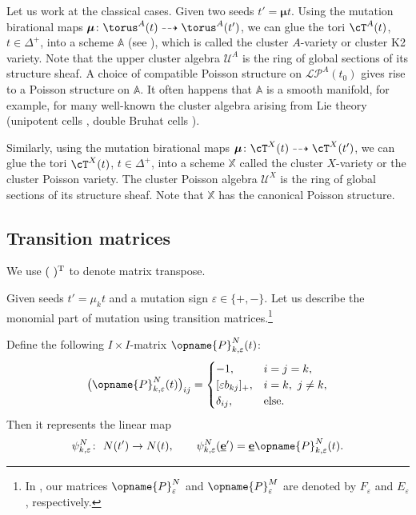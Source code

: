 \documentclass[pdftex]{sigma}
\newcommand{\upClAlg}{\mathcal{U}^A}
\newcommand{\XClAlg}{\mathcal{U}^X}
\newcommand{\AVar}{\mathbb{A}}
\newcommand{\XVar}{\mathbb{X}}
\newcommand{\LP}{{\mathcal{LP}}}
\newcommand{\seq}{\boldsymbol{\mu}}%
\newcommand{\trans}{\opname{P}}
\newcommand{\ee}{\mathbf{e}}
\newcommand{\uee}{\underline{\ee}}
\numberwithin{equation}{section}
\begin{document}
Let us work at the classical cases. Given two seeds $t'=\seq t$. Using the mutation birational maps $\seq\colon\torus^{A}(t)\dashrightarrow\torus^{A}(t')$,
we can glue the tori $\cT^{A}(t)$, $t\in\Delta^{+}$, into a scheme
$\AVar$ (see \cite[Proposition~2.4]{gross2013birational}), which
is called the cluster $A$-variety or cluster K2 variety. Note that
the upper cluster algebra $\upClAlg$ is the ring of global sections
of its structure sheaf. A choice of compatible Poisson structure on
$\LP^{A}(t_{0})$ gives rise to a Poisson structure on $\AVar$. It
often happens that $\AVar$ is a smooth manifold, for example, for
many well-known the cluster algebra arising from Lie theory (unipotent
cells \cite{GeissLeclercSchroeer10}, double Bruhat cells \cite{BerensteinFominZelevinsky05,goodearl2016berenstein}).

Similarly, using the mutation birational maps $\seq\colon\cT^{X}(t)\dashrightarrow\cT^{X}(t')$,
we can glue the tori $\cT^{X}(t)$, $t\in\Delta^{+}$, into a scheme
$\XVar$ called the cluster $X$-variety or the cluster Poisson variety. The cluster Poisson algebra
$\XClAlg$ is the ring of global sections of its structure sheaf.
Note that $\XVar$ has the canonical Poisson structure.

\subsection{Transition matrices}

We use $(\ )^{\rm T}$ to denote matrix transpose.

Given seeds $t'=\mu_{k}t$ and a mutation sign $\varepsilon\in\{+,-\}$.
Let us describe the monomial part of mutation using transition matrices.\footnote{In \cite{BerensteinZelevinsky05}, our matrices $\trans_{\varepsilon}^{N}$
and $\trans_{\varepsilon}^{M}$ are denoted by $F_{\varepsilon}$
and $E_{\varepsilon}$, respectively.}

Define the following $I\times I$-matrix $\trans_{k,\varepsilon}^{N}(t)$:
\begin{gather*}
\bigl(\trans_{k,\varepsilon}^{N}(t)\bigr)_{ij} = \begin{cases}
-1, & i=j=k,\\{}
[\varepsilon b_{kj}]_{+}, & i=k,\ j\neq k,\\
\delta_{ij}, & \mathrm{else}.
\end{cases}
\end{gather*}
Then it represents the linear map
\[\psi_{k,\varepsilon}^{N}\colon\ N(t')\rightarrow N(t),\qquad \psi_{k,\varepsilon}^{N}(\uee') =\uee\trans_{k,\varepsilon}^{N}(t).\]
\end{document}
